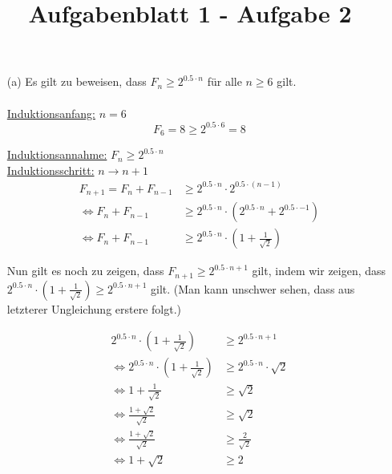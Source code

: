 \documentclass{article}
\title{Aufgabenblatt 1 - Aufgabe 2}
\author{}
\begin{document}
\maketitle

\begin{enumerate}
\item[(a)]
Es gilt zu beweisen, dass $F_n \geq 2^{0.5 \cdot n}$ für alle $n \geq 6$ gilt.\\
\\

\underline{Induktionsanfang:} \quad $n = 6$ \\
\begin{equation*}
F_6 = 8 \geq 2^{0.5 \cdot 6} = 8
\end{equation*}

\underline{Induktionsannahme:} \quad $F_n \geq 2^{0.5 \cdot n}$ \\

\underline{Induktionsschritt:} \quad $n \to n+1$ \\
\begin{align*}
F_{n+1} = F_{n} + F_{n-1} &\geq 2^{0.5 \cdot n} \cdot 2^{0.5 \cdot (n-1)} \\
\Leftrightarrow F_{n} + F_{n-1} &\geq 2^{0.5 \cdot n} \cdot \left( 2^{0.5 \cdot
n} + 2^{0.5 \cdot -1} \right) \\
\Leftrightarrow F_{n} + F_{n-1} &\geq 2^{0.5 \cdot n} \cdot \left( 1 +
\frac{1}{\sqrt{2}} \right)
\end{align*}

Nun gilt es noch zu zeigen, dass $F_{n+1} \geq 2^{0.5 \cdot n+1}$ gilt, indem
wir zeigen, dass $2^{0.5 \cdot n} \cdot \left( 1 + \frac{1}{\sqrt{2}} \right)
\geq 2^{0.5 \cdot n+1}$ gilt. (Man kann unschwer sehen, dass aus letzterer
Ungleichung erstere folgt.)

\begin{align*}
2^{0.5 \cdot n} \cdot \left( 1 + \frac{1}{\sqrt{2}} \right) &\geq 2^{0.5 \cdot
n+1} \\
\Leftrightarrow 2^{0.5 \cdot n} \cdot \left( 1 + \frac{1}{\sqrt{2}} \right)
&\geq 2^{0.5 \cdot n} \cdot \sqrt{2} \\
\Leftrightarrow 1 + \frac{1}{\sqrt{2}} &\geq \sqrt{2} \\
\Leftrightarrow \frac{1 + \sqrt{2}}{\sqrt{2}} &\geq \sqrt{2} \\
\Leftrightarrow \frac{1 + \sqrt{2}}{\sqrt{2}} &\geq \frac{2}{\sqrt{2}} \\
\Leftrightarrow 1 + \sqrt{2} &\geq 2
\end{align*}


\end{enumerate}
\end{document}
